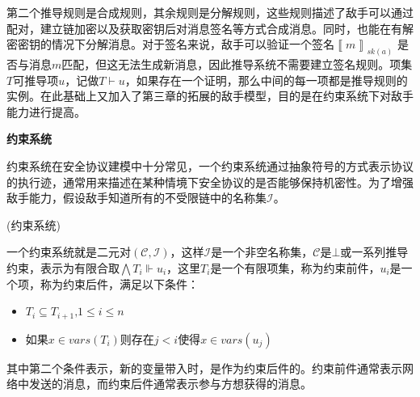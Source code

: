 第二个推导规则是合成规则，其余规则是分解规则，这些规则描述了敌手可以通过配对，建立链加密以及获取密钥后对消息签名等方式合成消息。同时，也能在有解密密钥的情况下分解消息。对于签名来说，敌手可以验证一个签名$\left\llbracket m\right\rrbracket _{sk(a)}$
是否与消息$m$匹配，但这无法生成新消息，因此推导系统不需要建立签名规则。项集$T$可推导项$u$，记做$T \vdash u$，如果存在一个证明，那么中间的每一项都是推导规则的实例。在此基础上又加入了第三章的拓展的敌手模型，目的是在约束系统下对敌手能力进行提高。


\textbf{约束系统}

约束系统在安全协议建模中十分常见，一个约束系统通过抽象符号的方式表示协议的执行迹，通常用来描述在某种情境下安全协议的是否能够保持机密性。为了增强敌手能力，假设敌手知道所有的不受限链中的名称集$\mathcal{I}$。

\begin{definition}{(约束系统)}

一个约束系统就是二元对$(\mathcal{C},\mathcal{I})$，这样$\mathcal{I}$是一个非空名称集，$\mathcal{C}$是$\bot$或一系列推导约束，表示为有限合取${\bigwedge T_{i}\Vdash u_{i}}$，这里$T_i$是一个有限项集，称为约束前件，$u_i$是一个项，称为约束后件，满足以下条件：

\begin{itemize}
\item $T_{i}\subseteq T_{i+1}\text{,}1\leq i\leq n$
\item 如果$x \in vars(T_i)$则存在$j<i$使得$x\in vars(u_j)$
\end{itemize}



\end{definition}

其中第二个条件表示，新的变量带入时，是作为约束后件的。约束前件通常表示网络中发送的消息，而约束后件通常表示参与方想获得的消息。






